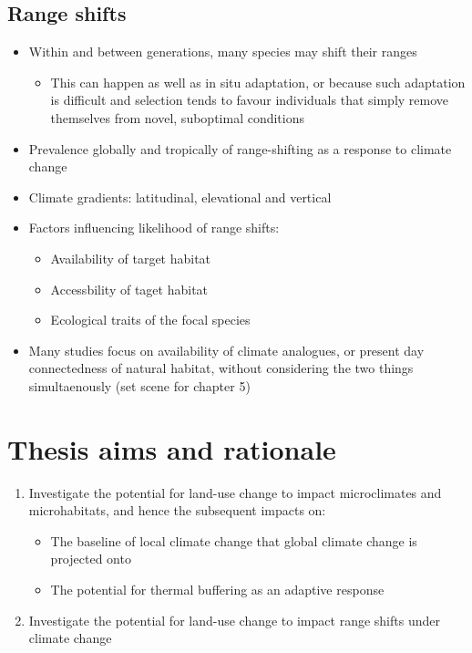 \documentclass[12pt,a4paper,]{report}
\providecommand{\tightlist}{%
  \setlength{\itemsep}{0pt}\setlength{\parskip}{0pt}}
\theoremstyle{definition}
\theoremstyle{definition}
\theoremstyle{definition}
\theoremstyle{remark}
\begin{document}
\subsection{Range shifts}\label{range-shifts}

\begin{itemize}
\tightlist
\item
  Within and between generations, many species may shift their ranges

  \begin{itemize}
  \tightlist
  \item
    This can happen as well as in situ adaptation, or because such
    adaptation is difficult and selection tends to favour individuals
    that simply remove themselves from novel, suboptimal conditions
  \end{itemize}
\item
  Prevalence globally and tropically of range-shifting as a response to
  climate change
\item
  Climate gradients: latitudinal, elevational and vertical
\item
  Factors influencing likelihood of range shifts:

  \begin{itemize}
  \tightlist
  \item
    Availability of target habitat
  \item
    Accessbility of taget habitat
  \item
    Ecological traits of the focal species
  \end{itemize}
\item
  Many studies focus on availability of climate analogues, or present
  day connectedness of natural habitat, without considering the two
  things simultaenously (set scene for chapter 5)
\end{itemize}

\section{Thesis aims and rationale}\label{thesis-aims-and-rationale}

\begin{enumerate}
\def\labelenumi{\arabic{enumi}.}
\tightlist
\item
  Investigate the potential for land-use change to impact microclimates
  and microhabitats, and hence the subsequent impacts on:

  \begin{itemize}
  \tightlist
  \item
    The baseline of local climate change that global climate change is
    projected onto
  \item
    The potential for thermal buffering as an adaptive response
  \end{itemize}
\item
  Investigate the potential for land-use change to impact range shifts
  under climate change
\end{enumerate}
\end{document}
